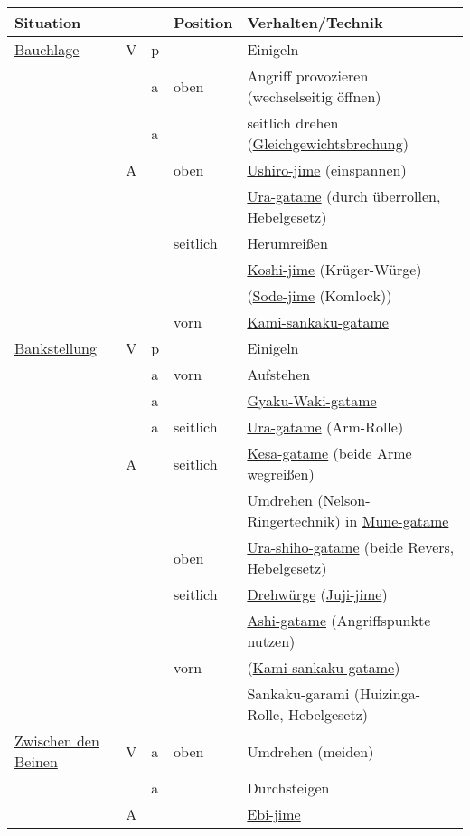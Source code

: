 \documentclass[justified, a4paper, notitlepage, captions=tableheading, nobib]{tufte-handout}
\begin{document}
\begin{center}
\begin{tabular}{lllll}
Situation\footnotemark &  &  & Position & Verhalten/Technik\\
\hline
\hyperref[org8d6889b]{Bauchlage} & V & p &  & Einigeln\\
 &  & a & oben & Angriff provozieren (wechselseitig öffnen)\\
 &  & a &  & seitlich drehen (\hyperref[orgc1d00b8]{Gleichgewichtsbrechung})\\
 & A &  & oben & \hyperref[orgf7974da]{Ushiro-jime} (einspannen)\\
 &  &  &  & \hyperref[org5a515a8]{Ura-gatame} (durch überrollen, Hebelgesetz)\\
 &  &  & seitlich & Herumreißen\\
 &  &  &  & \hyperref[org911829b]{Koshi-jime} (Krüger-Würge)\\
 &  &  &  & (\hyperref[org9269882]{Sode-jime} (Komlock))\\
 &  &  & vorn & \hyperref[orgfe1fdeb]{Kami-sankaku-gatame}\\
\hline
\hyperref[orgd4877a8]{Bankstellung} & V & p &  & Einigeln\\
 &  & a & vorn & Aufstehen\\
 &  & a &  & \hyperref[org96343f4]{Gyaku-Waki-gatame}\\
 &  & a & seitlich & \hyperref[org5a515a8]{Ura-gatame} (Arm-Rolle)\\
 & A &  & seitlich & \hyperref[org06d0492]{Kesa-gatame} (beide Arme wegreißen)\\
 &  &  &  & Umdrehen (Nelson-Ringertechnik) in \hyperref[org97af0c8]{Mune-gatame}\\
 &  &  & oben & \hyperref[org70b9129]{Ura-shiho-gatame} (beide Revers, Hebelgesetz)\\
 &  &  & seitlich & \hyperref[orgf618d5a]{Drehwürge} (\hyperref[org40ebf6d]{Juji-jime})\\
 &  &  &  & \hyperref[orgaa5a7e1]{Ashi-gatame} (Angriffspunkte nutzen)\\
 &  &  & vorn & (\hyperref[orgfe1fdeb]{Kami-sankaku-gatame})\\
 &  &  &  & Sankaku-garami (Huizinga-Rolle, Hebelgesetz)\footnotemark\\
\hline
\hyperref[org9bede9d]{Zwischen den Beinen} & V & a & oben & Umdrehen (meiden)\\
 &  & a &  & Durchsteigen\\
 & A &  &  & \hyperref[orgb72c4d6]{Ebi-jime}\\

\end{tabular}
\end{center}
\end{document}
